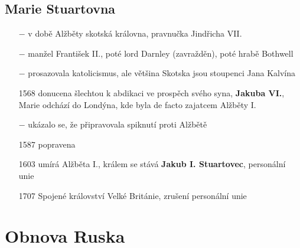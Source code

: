 \documentclass{article}
\begin{document}
\subsection*{Marie Stuartovna}
\begin{itemize}
    \vspace{-0.5em}
    \setlength\itemsep{0.15em}
    \item[$-$] v době Alžběty skotská královna, pravnučka Jindřicha VII.
    \item[$-$] manžel František II., poté lord Darnley (zavražděn), poté hrabě Bothwell
    \item[$-$] prosazovala katolicismus, ale většina Skotska jsou stoupenci Jana Kalvína
    \item[1568] donucena šlechtou k abdikaci ve prospěch svého syna, \textbf{Jakuba VI.}, Marie odchází do Londýna, kde byla de facto zajatcem Alžběty I.
    \item[$-$] ukázalo se, že připravovala spiknutí proti Alžbětě
    \item[1587] popravena
\end{itemize}

\begin{itemize}
    \vspace{-0.5em}
    \setlength\itemsep{0.15em}
    \item[1603] umírá Alžběta I., králem se stává \textbf{Jakub I. Stuartovec}, personální unie
    \item[1707] Spojené království Velké Británie, zrušení personální unie
  \end{itemize}

\section*{Obnova Ruska}
\end{document}
